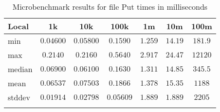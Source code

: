 \begin{table}
{\begin{tabular}[h]{l|c|c|c|c|c|c}
\textbf{Local} & \textbf{1k} & \textbf{10k} & \textbf{100k} & \textbf{1m} & \textbf{10m} & \textbf{100m} \\
\hline
min & $0.04600$ & $0.05800$ & $0.1590$ & $1.259$ & $14.19$ & $181.9$ \\
max & $0.2140$ & $0.2160$ & $0.5640$ & $2.917$ & $24.47$ & $12120$ \\
median & $0.06900$ & $0.06100$ & $0.1630$ & $1.311$ & $14.85$ & $345.5$ \\
mean & $0.06537$ & $0.07503$ & $0.1866$ & $1.378$ & $15.35$ & $1188$ \\
stddev & $0.01914$ & $0.02798$ & $0.05609$ & $1.889$ & $1.889$ & $2205$ \\
\\
\end{tabular}
}
\caption{Microbenchmark results for file Put times in milliseconds}
\end{table}



